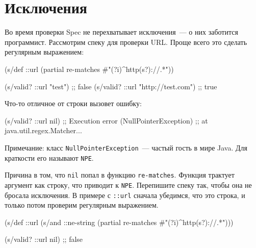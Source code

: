 \section{Исключения}


Во время проверки Spec не перехватывает исключения~--- о них заботится
программист. Рассмотрим спеку для проверки URL. Проще всего это сделать
регулярным выражением:


\begin{english}
  \begin{clojure}
(s/def ::url
  (partial re-matches #"(?i)^http(s?)://.*"))

(s/valid? ::url "test")            ;; false
(s/valid? ::url "http://test.com") ;; true
  \end{clojure}
\end{english}

Что-то отличное от строки вызовет ошибку:


\begin{english}
  \begin{clojure}
(s/valid? ::url nil)
;; Execution error (NullPointerException)
;; at java.util.regex.Matcher...
  \end{clojure}
\end{english}


Примечание: класс \verb|NullPointerException|~--- частый гость в мире Java. Для
краткости его называют \verb|NPE|.

Причина в том, что \verb|nil| попал в функцию \verb|re-matches|. Функция
трактует аргумент как строку, что приводит к \verb|NPE|. Перепишите спеку так,
чтобы она не бросала исключения. В примере с \verb|::url| сначала убедимся,
что это строка, и только потом проверим регулярным выражением.

\begin{english}
  \begin{clojure}
(s/def ::url
  (s/and ::ne-string
         (partial re-matches #"(?i)^http(s?)://.*")))

(s/valid? ::url nil) ;; false
  \end{clojure}
\end{english}


